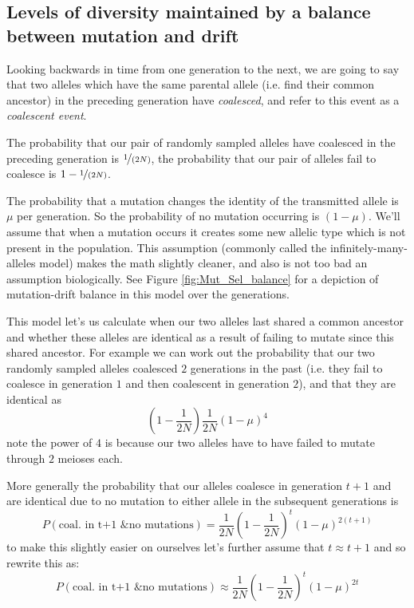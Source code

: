 \subsection{Levels of diversity maintained by a balance between
 mutation and drift} \label{DriftMutationBalance}

Looking backwards in time from one generation to the next, we are going to say
that two alleles which have the same parental allele (i.e. find their common
ancestor) in the preceding generation have \emph{coalesced}, and refer to this
event as a \emph{coalescent event}.

The probability that our pair of randomly sampled alleles have coalesced in the
preceding generation is $\nicefrac{1}{(2N)}$, the probability that our pair of
alleles fail to coalesce is $1-\nicefrac{1}{(2N)}$. 

The probability that a mutation changes the identity of the
transmitted allele is $\mu$ per generation. So the probability of no
mutation occurring is $(1-\mu)$. We'll assume that when a mutation
occurs it creates some new allelic type which is not present in the
population. This assumption (commonly called the infinitely-many-alleles model) makes the math slightly cleaner, and also
is not too bad an assumption biologically. See Figure
\ref{fig:Mut_Sel_balance} for a depiction of mutation-drift balance in
this model over the generations.

This model let's us calculate when our two alleles last shared a common
ancestor and whether these alleles are identical as a result of
failing to mutate since this shared ancestor.  For example we can work out the probability that our
two randomly sampled alleles coalesced $2$ generations in the past
(i.e. they fail to coalesce in generation $1$ and then coalescent in
generation $2$), and
that they are identical as
\begin{equation}
\left(1- \frac{1}{2N} \right) \frac{1}{2N} (1-\mu)^4
\end{equation}
note the power of $4$ is because our two alleles have to have failed
to mutate through $2$ meioses each.

More generally the probability that our alleles coalesce in generation
$t+1$ and are identical due to no mutation to either allele in the
subsequent generations is
%
\begin{equation}
P(\textrm{coal. in t+1 \& no mutations}) =  \frac{1}{2N} \left(1- \frac{1}{2N} \right)^t \left(1-\mu \right)^{2(t+1)}
\end{equation}
%
to make this slightly easier on ourselves let's further assume that $t
\approx t+1$ and so rewrite this as:
\begin{equation}
P(\textrm{coal. in t+1 \& no mutations}) \approx \frac{1}{2N} \left(1- \frac{1}{2N} \right)^t \left(1-\mu \right)^{2t}
\end{equation}
%

